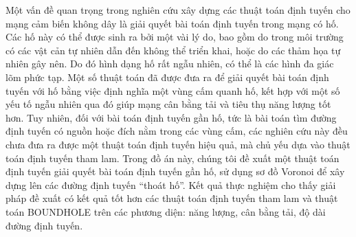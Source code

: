 \begin{abstracts}         
Một vấn đề quan trọng trong nghiên cứu xây dựng các thuật toán định tuyến cho mạng cảm biến không dây là giải quyết bài toán định tuyến trong mạng có hố. Các hố này có thể được sinh ra bởi một vài lý do, bao gồm do trong môi trường có các vật cản tự nhiên dẫn đến không thể triển khai, hoặc do các thảm họa tự nhiên gây nên. Do đó hình dạng hố rất ngẫu nhiên, có thể là các hình đa giác lõm phức tạp. Một số thuật toán đã được đưa ra để giải quyết bài toán định tuyến với hố bằng việc định nghĩa một vùng cấm quanh hố, kết hợp với một số yếu tố ngẫu nhiên qua đó giúp mạng cân bằng tải và tiêu thụ năng lượng tốt hơn. Tuy nhiên, đối với bài toán định tuyến gần hố, tức là bài toán tìm đường định tuyến có nguồn hoặc đích nằm trong các vùng cấm, các nghiên cứu này đều chưa đưa ra được một thuật toán định tuyến hiệu quả, mà chủ yếu dựa vào thuật toán định tuyến tham lam. Trong đồ án này, chúng tôi đề xuất một thuật toán định tuyến giải quyết bài toán định tuyến gần hố, sử dụng sơ đồ Voronoi để xây dựng lên các đường định tuyến “thoát hố”. Kết quả thực nghiệm cho thấy giải pháp đề xuất có kết quả tốt hơn các thuật toán định tuyến tham lam và thuật toán BOUNDHOLE trên các phương diện: năng lượng, cân bằng tải, độ dài đường định tuyến. 
\end{abstracts}
 